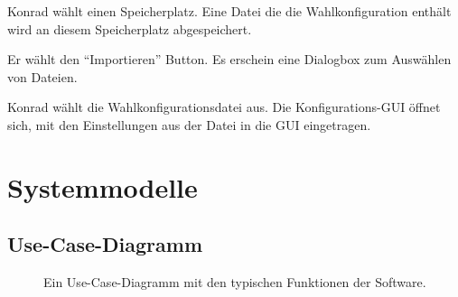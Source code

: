 \documentclass[parskip=full,11pt,twoside]{scrartcl}
\begin{document}
\teststep{}
		{Konrad wählt einen Speicherplatz.}
		{Eine Datei die die Wahlkonfiguration enthält wird an diesem Speicherplatz abgespeichert.}

		{Er wählt den \enquote{Importieren} Button.}
		{Es erschein eine Dialogbox zum Auswählen von Dateien.}
		
\teststep{}
		{Konrad wählt die Wahlkonfigurationsdatei aus.}
		{Die Konfigurations-GUI öffnet sich, mit den Einstellungen aus der Datei in die GUI eingetragen.}

\section{Systemmodelle}

\subsection{Use-Case-Diagramm}
\begin{figure}[H]
	\caption{\label{fig:usecase}
		Ein Use-Case-Diagramm mit den typischen Funktionen der Software.
	}
\end{figure}
\end{document}
